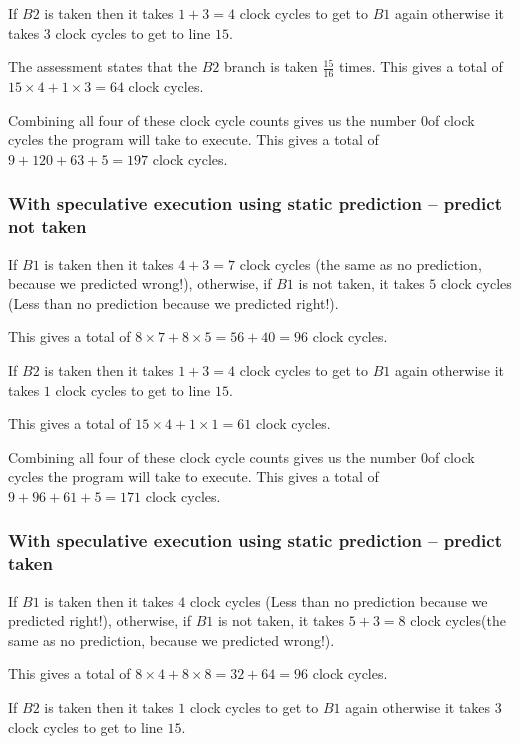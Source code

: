 \documentclass[12pt]{article}
\begin{document}
				If $B2$ is taken then it takes $1 + 3 = 4$ clock cycles to get to $B1$ again otherwise it takes $3$ clock cycles to get to line $15$.
				
				The assessment states that the $B2$ branch is taken $\frac{15}{16}$ times. This gives a total of $15\times4 + 1\times3 = 64$ clock cycles.
			
				Combining all four of these clock cycle counts gives us the number 0of clock cycles the program will take to execute.
				This gives a total of $9 + 120 + 63 + 5 = 197$ clock cycles.
			
			\subsubsection{With speculative execution using static prediction – predict not taken}
			
				If $B1$ is taken then it takes $4 + 3 = 7$ clock cycles (the same as no prediction, because we predicted wrong!), otherwise, if $B1$ is not taken, it takes $5$ clock cycles (Less than no prediction because we predicted right!).
				
				This gives a total of $ 8\times7 + 8\times5 = 56 + 40 = 96$ clock cycles.
				
				If $B2$ is taken then it takes $1 + 3 = 4$ clock cycles to get to $B1$ again otherwise it takes $1$ clock cycles to get to line $15$.
			
				This gives a total of $15\times4 + 1\times1 = 61$ clock cycles.
				
				
				Combining all four of these clock cycle counts gives us the number 0of clock cycles the program will take to execute.
				This gives a total of $9 + 96 + 61 + 5 = 171$ clock cycles.
				
			\subsubsection{With speculative execution using static prediction – predict taken}
			
				If $B1$ is taken then it takes $4$ clock cycles  (Less than no prediction because we predicted right!), otherwise, if $B1$ is not taken, it takes $5 + 3 = 8$ clock cycles(the same as no prediction, because we predicted wrong!).
				
				This gives a total of $ 8\times4 + 8\times8 = 32 + 64 = 96$ clock cycles.
				
				If $B2$ is taken then it takes $1$ clock cycles to get to $B1$ again otherwise it takes $3$ clock cycles to get to line $15$.
			
\end{document}
